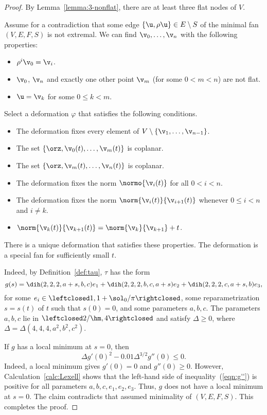\begin{proof} 
By Lemma~\ref{lemma:3-nonflat}, there are at least three flat
nodes of $V$.

Assume for a contradiction that some edge $\{\u,\rho\u\}\in
E\setminus S$ of the minimal fan $(V,E,F,S)$ is not extremal.  
We can find $\v_0,\ldots,\v_n$ with the following properties:
\begin{itemize}
\item $\rho^i\v_0 =\v_i$.
\item $\v_0$, $\v_n$ and exactly one other point $\v_m$ (for some $0<m<n$) are not flat.  
\item $\u=\v_k$ for some $0\le k<m$.
\end{itemize}

Select a deformation $\varphi$ that satisfies the following conditions.
\begin{itemize}
\item The deformation fixes every element of
$V\setminus\{\v_1,\ldots,\v_{n-1}\}$.
\item The set $\{\orz,\v_0(t),\ldots,\v_m(t)\}$ is coplanar.
\item The set $\{\orz,\v_m(t),\ldots,\v_n(t)\}$ is coplanar.
\item The deformation  fixes the norm $\normo{\v_i(t)}$ for all $0<i<n$.
\item The deformation fixes the norm $\norm{\v_i(t)}{\v_{i+1}(t)}$ whenever $0\le i<n$ and $i\ne k$.
\item $\norm{\v_k(t)}{\v_{k+1}(t)} = \norm{\v_k}{\v_{k+1}}+t$.
\end{itemize}
There is a unique deformation that satisfies these properties.  The
deformation is a special fan for sufficiently small $t$.

  Indeed, by Definition~\ref{def:tau},
$\tau$ has the form
\begin{displaymath}
  g(s) = \dih(2,2,2,a+s,b,c) e_1 
+ \dih(2,2,2,b,c,a+s) e_2 + \dih(2,2,2,c,a+s,b) e_3,
\end{displaymath}
for some $e_i\in\leftclosed1,1+\sol_0/\pi\rightclosed$, some
reparametrization $s=s(t)$ of $t$ such that $s(0)=0$, and some
parameters $a,b,c$.  The parameters $a,b,c$ lie in
$\leftclosed2/\hm,4\rightclosed$ and satisfy $\Delta\ge0$, where
$\Delta = \Delta(4,4,4,a^2,b^2,c^2)$.

If $g$ has a local minimum at $s=0$, then
\begin{equation}\label{eqn:g''}
\Delta g'(0)^2 - 0.01\Delta^{3/2} g''(0) \le 0.
\end{equation}
Indeed, a local minimum gives $g'(0)=0$ and $g''(0)\ge0$.
However, Calculation~\ref{calc:Lexell} shows that the
left-hand side of inequality~(\ref{eqn:g''}) is positive for all
parameters $a,b,c,e_1,e_2,e_3$.  Thus, $g$ does not have a  local minimum at $s=0$.
The claim contradicts that assumed minimality of $(V,E,F,S)$.  This
completes the proof.
\end{proof}


